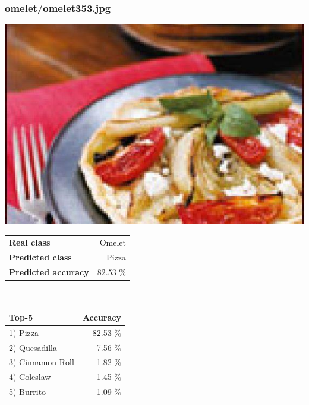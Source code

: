 \subsubsection{omelet/omelet353.jpg}

\begin{minipage}[t]{0.4\textwidth}
	\vspace{0pt}
	\includegraphics[width=\linewidth]{images/evaluation-images/omelet/omelet353.jpg}
\end{minipage}
\hfill
\begin{minipage}[t]{0.5\textwidth}
	\vspace{0pt}\raggedright
	\begin{tabularx}{\textwidth}{X r}
		\small \textbf{Real class} & \small Omelet\\
		\small \textbf{Predicted class} & \small Pizza\\
		\small \textbf{Predicted accuracy} & \small 82.53 \%
    \end{tabularx}\\
    
    \vspace{6pt}
	\begin{tabularx}{\textwidth}{X r}
        \small \textbf{Top-5} & \small \textbf{Accuracy} \\
        \hline
		\small 1) Pizza & \small 82.53 \%\\\small 2) Quesadilla & \small 7.56 \%\\\small 3) Cinnamon Roll & \small 1.82 \%\\\small 4) Coleslaw & \small 1.45 \%\\\small 5) Burrito & \small 1.09 \%
    \end{tabularx}
\end{minipage}
    
